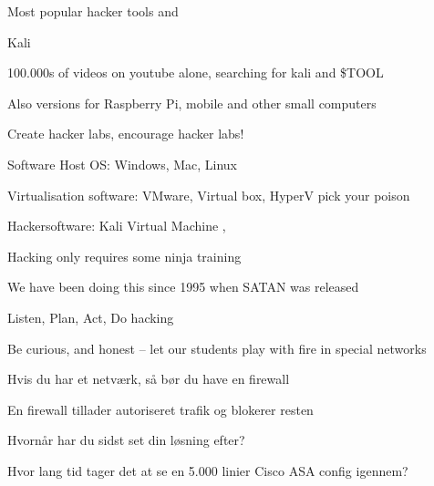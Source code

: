 \documentclass[Screen16to9,17pt]{foils}
\begin{document}
\vskip 5mm
\centerline{Most popular hacker tools  and }




\begin{list1}
\item  Kali 
\item 100.000s of videos on youtube alone, searching for kali and \$TOOL
\item Also versions for Raspberry Pi, mobile and other small computers
\end{list1}




\begin{list2}
\item Create hacker labs, encourage hacker labs!
\item Software Host OS: Windows, Mac, Linux
\item Virtualisation software: VMware, Virtual box, HyperV pick your poison
\item Hackersoftware: Kali Virtual Machine  ,
\end{list2}



\begin{list2}
\item Hacking only requires some ninja training
\item We have been doing this since 1995 when SATAN was released
\item Listen, Plan, Act, Do hacking
\item Be curious, and honest -- let our students play with fire in special networks
\end{list2}



\begin{list2}
\item Hvis du har et netværk, så bør du have en firewall
\item En firewall tillader autoriseret trafik og blokerer resten
\item Hvornår har du sidst set din løsning efter?
\item Hvor lang tid tager det at se en 5.000 linier Cisco ASA config igennem?
\end{list2}
\end{document}
